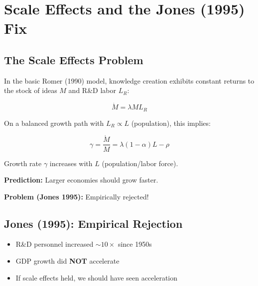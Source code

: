 
\section{Scale Effects and the Jones (1995) Fix}

\subsection*{The Scale Effects Problem}

In the basic Romer (1990) model, knowledge creation exhibits constant returns to the
stock of ideas $M$ and R\&D labor $L_R$:

\[
\dot{M} = \lambda M L_R
\tag{Romer Knowledge}
\]

On a balanced growth path with $L_R \propto L$ (population), this implies:

\[
\gamma = \frac{\dot{M}}{M} = \lambda (1-\alpha)L - \rho
\tag{Romer Growth}
\]

\begin{tcolorbox}[colback=red!10,colframe=red!60,title=Scale Effects Problem]
Growth rate $\gamma$ increases with $L$ (population/labor force).
\bigskip

\textbf{Prediction:} Larger economies should grow faster.
\bigskip

\textbf{Problem (Jones 1995):} Empirically rejected!
\end{tcolorbox}

\subsection{Jones (1995): Empirical Rejection}

\begin{itemize}
    \item R\&D personnel increased $\sim 10\times$ since 1950s
    \item GDP growth did \textbf{NOT} accelerate
    \item If scale effects held, we should have seen acceleration
\end{itemize}

